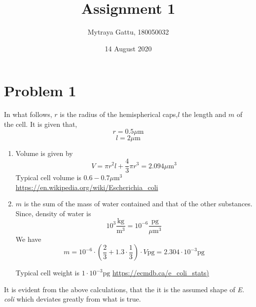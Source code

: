 \documentclass{article}
\title{Assignment 1}
\author{Mytraya Gattu, 180050032}
\date{14 August 2020}
\begin{document}
\maketitle

\section{Problem 1}
In what follows, $r$ is the radius of the hemispherical caps,$l$ the length and $m$ of the cell. It is given that, 
$$r=0.5\mu \text{m}$$
$$l=2\mu \text{m}$$
\begin{enumerate}[label=(\alph*)]
  \item Volume is given by $$V=\pi r^2 l + \frac{4}{3}\pi r^{3} = 2.094 \mu \text{m}^{3}$$
  Typical cell volume is $0.6-0.7 \mu \text{m}^{3}$
  \newline
  \url{https://en.wikipedia.org/wiki/Escherichia_coli}
  \item $m$ is the sum of the mass of water contained and that of the other substances. Since, density of water is $$10^3 \frac{\text{kg}}{\text{m}^3}=10^{-6} \frac{\text{pg}}{\mu \text{m}^3}$$
  We have
  $$m=10^{-6} \cdot \left(\frac{2}{3} + 1.3\cdot \frac{1}{3}\right)\cdot V \text{pg} = 2.304 \cdot 10^{-3} \text{pg}$$
  
  Typical cell weight is $1\cdot 10^{-3} \text{pg}$ \newline \url{https://ecmdb.ca/e_coli_stats)}
\end{enumerate}
It is evident from the above calculations, that the it is the assumed shape of \textit{E. coli} which deviates greatly from what is true. 
\end{document}
